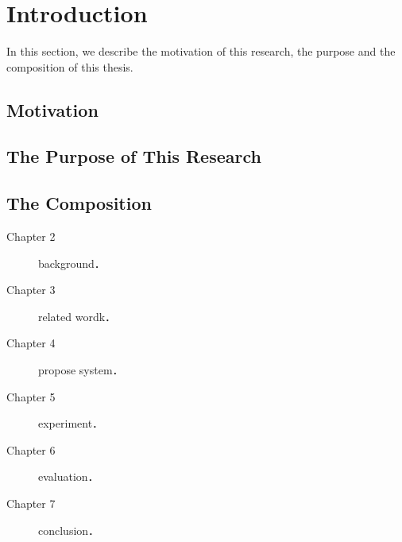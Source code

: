 \chapter{Introduction}
In this section, we describe the motivation of this research, the purpose and the composition of this thesis.

\section{Motivation} \label{sec:intro}

\section{The Purpose of This Research}

\section{The Composition}

\begin{description}
 \item[Chapter 2] background．
 \item[Chapter 3] related wordk．
 \item[Chapter 4] propose system．
 \item[Chapter 5] experiment．
 \item[Chapter 6] evaluation．
 \item[Chapter 7] conclusion．
\end{description}

